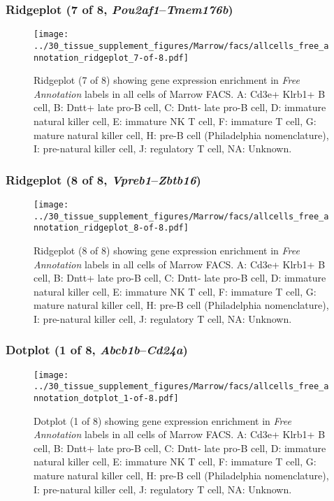 \clearpage

\subsubsection{Ridgeplot (7 of 8, \emph{Pou2af1}--\emph{Tmem176b})}
\begin{figure}[h]
\centering
\texttt{[image: ../30\_tissue\_supplement\_figures/Marrow/facs/allcells\_free\_annotation\_ridgeplot\_7-of-8.pdf]}

\caption{ Ridgeplot (7 of 8)  showing gene expression enrichment in \emph{Free Annotation} labels in all cells of Marrow FACS. A: Cd3e+ Klrb1+ B cell, B: Dntt+ late pro-B cell, C: Dntt- late pro-B cell, D: immature natural killer cell, E: immature NK T cell, F: immature T cell, G: mature natural killer cell, H: pre-B cell (Philadelphia nomenclature), I: pre-natural killer cell, J: regulatory T cell, NA: Unknown.}
\end{figure}


\clearpage

\subsubsection{Ridgeplot (8 of 8, \emph{Vpreb1}--\emph{Zbtb16})}
\begin{figure}[h]
\centering
\texttt{[image: ../30\_tissue\_supplement\_figures/Marrow/facs/allcells\_free\_annotation\_ridgeplot\_8-of-8.pdf]}

\caption{ Ridgeplot (8 of 8)  showing gene expression enrichment in \emph{Free Annotation} labels in all cells of Marrow FACS. A: Cd3e+ Klrb1+ B cell, B: Dntt+ late pro-B cell, C: Dntt- late pro-B cell, D: immature natural killer cell, E: immature NK T cell, F: immature T cell, G: mature natural killer cell, H: pre-B cell (Philadelphia nomenclature), I: pre-natural killer cell, J: regulatory T cell, NA: Unknown.}
\end{figure}


\clearpage

\subsubsection{Dotplot (1 of 8, \emph{Abcb1b}--\emph{Cd24a})}
\begin{figure}[h]
\centering
\texttt{[image: ../30\_tissue\_supplement\_figures/Marrow/facs/allcells\_free\_annotation\_dotplot\_1-of-8.pdf]}

\caption{ Dotplot (1 of 8)  showing gene expression enrichment in \emph{Free Annotation} labels in all cells of Marrow FACS. A: Cd3e+ Klrb1+ B cell, B: Dntt+ late pro-B cell, C: Dntt- late pro-B cell, D: immature natural killer cell, E: immature NK T cell, F: immature T cell, G: mature natural killer cell, H: pre-B cell (Philadelphia nomenclature), I: pre-natural killer cell, J: regulatory T cell, NA: Unknown.}
\end{figure}


